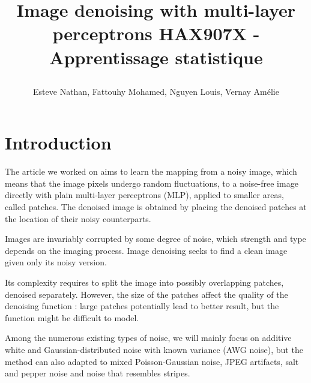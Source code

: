 \documentclass[10pt,a4paper]{article}
\author{Esteve Nathan, Fattouhy Mohamed, Nguyen Louis, Vernay Amélie}
\title{%
    \begin{minipage}\linewidth
        \centering
        Image denoising with multi-layer perceptrons
        \vskip3pt
        \large 
        HAX907X - Apprentissage statistique
    \end{minipage}
}
\newcommand{\svs}{\vspace{9pt}}
\begin{document}
\maketitle
\section{Introduction}

The article we worked on \citep{denoise} aims to learn the mapping from a noisy image, which means that the image pixels undergo random fluctuations, to a noise-free image directly with plain multi-layer perceptrons (MLP), applied to smaller areas, called patches. The denoised image is obtained by placing the denoised patches at the location of their noisy counterparts.

\svs

Images are invariably corrupted by some degree of noise, which strength and type depends on the imaging process. Image denoising seeks to find a clean image given only its noisy version.

\svs

Its complexity requires to split the image into possibly overlapping patches, denoised separately.
However, the size of the patches affect the quality of the denoising function : large patches potentially lead to better result, but the function might be difficult to model.

\svs

Among the numerous existing types of noise, we will mainly focus on additive white and Gaussian-distributed noise with known variance (AWG noise), but the method can also adapted to mixed Poisson-Gaussian noise, JPEG artifacts, salt and pepper noise and noise that resembles stripes.

\svs



\svs

\end{document}
